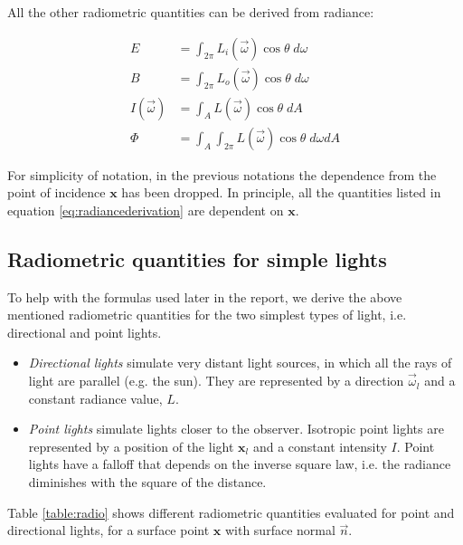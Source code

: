 All the other radiometric quantities can be derived from radiance:

\begin{equation}
\begin{split}
E &= \int_{2\pi} L_i(\vec{\omega}) \cos\theta \; d\omega \\
B &= \int_{2\pi} L_o(\vec{\omega}) \cos\theta \; d\omega \\
I(\vec{\omega}) &= \int_A L(\vec{\omega}) \cos\theta \; dA \\
\Phi &= \int_A \int_{2\pi} L(\vec{\omega}) \cos\theta \; d\omega dA
\end{split}
\label{eq:radiancederivation} 
\end{equation}

For simplicity of notation, in the previous notations the dependence from the point of incidence $\mathbf{x}$ has been dropped. In principle, all the quantities listed in equation \ref{eq:radiancederivation} are dependent on $\mathbf{x}$.

\subsection{Radiometric quantities for simple lights}

To help with the formulas used later in the report, we derive the above mentioned radiometric quantities for the two simplest types of light, i.e. directional and point lights.
\begin{itemize}
	\item \textit{Directional lights} simulate very distant light sources, in which all the rays of light are parallel (e.g. the sun). They are represented by a direction $\vec{\omega}_l$ and a constant radiance value, $L$. 
	\item \textit{Point lights} simulate lights closer to the observer. Isotropic point lights are represented by a position of the light $\mathbf{x}_l$ and a constant intensity $I$. Point lights have a falloff that depends on the inverse square law, i.e. the radiance diminishes with the square of the distance.
\end{itemize}

Table \ref{table:radio} shows different radiometric quantities evaluated for point and directional lights, for a surface point $\mathbf{x}$ with surface normal $\vec{n}$. 

